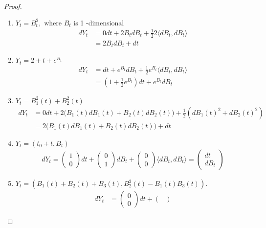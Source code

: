 \documentclass[11pt]{article}
\newcommand\ip[2]{\langle #1, #2 \rangle}
\begin{document}
 \begin{proof} $ $ \newline
 \begin{enumerate}
 \item $Y _ { t } = B _ { t } ^ { 2 } ,$ where $B _ { t }$ is 1 -dimensional
 \begin{align*}
 dY_t &= 0 dt + 2B_t dB_t+ \frac{1}{2}2 \ip{dB_t}{dB_t}\\
 &= 2B_t dB_t +dt
 \end{align*}
 \item$Y _ { t } = 2 + t + e ^ { B _ { t } }$
 \begin{align*}
 dY_t &= dt + e^{B_t} dB_t +\frac{1}{2}e^{B_t} \ip{dB_t}{dB_t}\\
 &= (1+\frac{1}{2}e^{B_t}) dt + e^{B_t}dB_t
 \end{align*}
 \item $Y _ { t } = B _ { 1 } ^ { 2 } ( t ) + B _ { 2 } ^ { 2 } ( t )$
 \begin{align*}
 dY_t &= 0 dt + 2 \big( B_1(t) dB_1(t) +B_2(t) dB_2(t) \big)+ \frac{1}{2}(dB_1(t)^2 + dB_2(t)^2) \\
 &=  2 \big( B_1(t) dB_1(t) +B_2(t) dB_2(t) \big)+ dt
 \end{align*}
 \item $Y _ { t } = \left( t _ { 0 } + t , B _ { t } \right) $ 
 \begin{align*}
 dY_t = \begin{pmatrix}
 1 \\ 0
 \end{pmatrix} dt + 
 \begin{pmatrix}
 0 \\ 1
 \end{pmatrix} dB_t+
  \begin{pmatrix}
 0 \\ 0
 \end{pmatrix} \ip{dB_t}{dB_t} = 
 \begin{pmatrix}
 dt \\ dB_t
 \end{pmatrix}
 \end{align*}
 \item $Y _ { t } = \left( B _ { 1 } ( t ) + B _ { 2 } ( t ) + B _ { 3 } ( t ) , B _ { 2 } ^ { 2 } ( t ) - B _ { 1 } ( t ) B _ { 3 } ( t ) \right)$. 
 \begin{align*}
 dY_t &= \begin{pmatrix}
 0 \\ 0
 \end{pmatrix}dt + 
 \begin{pmatrix}

\end{pmatrix}
\end{align*}
\end{enumerate}
\end{proof}
\end{document}
